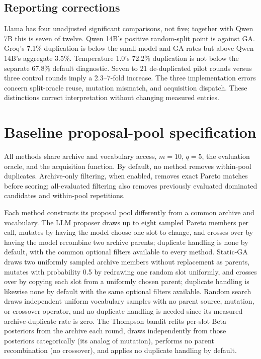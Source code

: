 \subsection{Reporting corrections}
Llama has four unadjusted significant comparisons, not five; together with Qwen 7B this is seven of twelve. Qwen 14B's positive random-split point is against GA. Groq's 7.1\% duplication is below the small-model and GA rates but above Qwen 14B's aggregate 3.5\%. Temperature 1.0's 72.2\% duplication is not below the separate 67.8\% default diagnostic. Seven to 21 de-duplicated pilot rounds versus three control rounds imply a 2.3--7-fold increase. The three implementation errors concern split-oracle reuse, mutation mismatch, and acquisition dispatch. These distinctions correct interpretation without changing measured entries.

\section{Baseline proposal-pool specification}
\label{app:baselines}
All methods share archive and vocabulary access, $m=10$, $q=5$, the evaluation oracle, and the acquisition function. By default, no method removes within-pool duplicates. Archive-only filtering, when enabled, removes exact Pareto matches before scoring; all-evaluated filtering also removes previously evaluated dominated candidates and within-pool repetitions.

Each method constructs its proposal pool differently from a common archive and vocabulary. The LLM proposer draws up to eight sampled Pareto members per call, mutates by having the model choose one slot to change, and crosses over by having the model recombine two archive parents; duplicate handling is none by default, with the common optional filters available to every method. Static-GA draws two uniformly sampled archive members without replacement as parents, mutates with probability 0.5 by redrawing one random slot uniformly, and crosses over by copying each slot from a uniformly chosen parent; duplicate handling is likewise none by default with the same optional filters available. Random search draws independent uniform vocabulary samples with no parent source, mutation, or crossover operator, and no duplicate handling is needed since its measured archive-duplicate rate is zero. The Thompson bandit refits per-slot Beta posteriors from the archive each round, draws independently from those posteriors categorically (its analog of mutation), performs no parent recombination (no crossover), and applies no duplicate handling by default.


